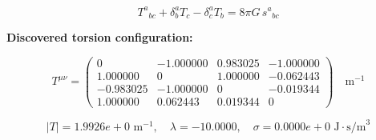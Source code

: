 
\begin{equation}
  T^a{}_{bc} + \delta^a_b T_c - \delta^a_c T_b = 8\pi G \, s^a{}_{bc}
\end{equation}

\textbf{Discovered torsion configuration:}

\begin{equation}
  T^{\mu\nu} = \begin{pmatrix}
    0 & -1.000000 & 0.983025 & -1.000000 \\
    1.000000 & 0 & 1.000000 & -0.062443 \\
    -0.983025 & -1.000000 & 0 & -0.019344 \\
    1.000000 & 0.062443 & 0.019344 & 0
  \end{pmatrix} \quad \text{m}^{-1}
\end{equation}

\begin{equation}
  |T| = 1.9926e+0 \text{ m}^{-1}, \quad
  \lambda = -10.0000, \quad
  \sigma = 0.0000e+0 \text{ J}\cdot\text{s/m}^3
\end{equation}